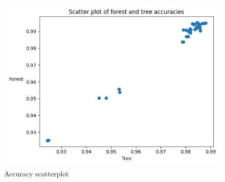 \documentclass[12pt, letterpaper]{article}
\begin{document}
\begin{figure}[H]
    \centering
    \includegraphics[scale=0.7]{accuracy_scatterplot_100.png}
    \caption{Accuracy scatterplot}
    \label{acc_plt_100} %
\end{figure}
\end{document}
